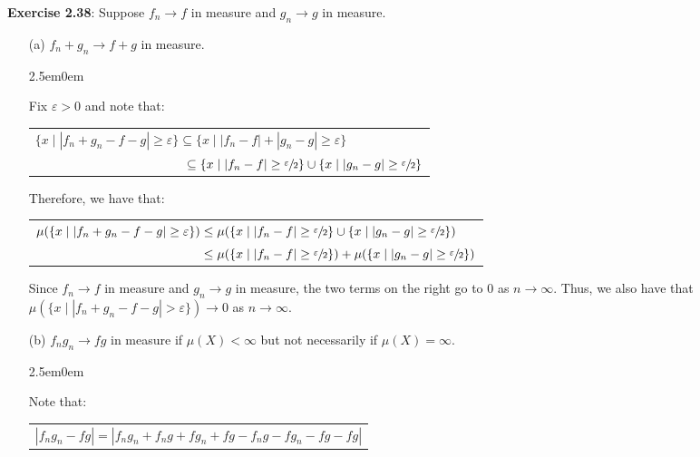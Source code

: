 \documentclass{book}
\newcommand{\exTwoP}{%
   \color{RedViolet}%
   \fontsize{13}{15}\selectfont%
}
\newcommand{\exPP}{%
   \color{RedViolet}%
   \fontsize{12}{14}\selectfont%
}
\newenvironment{myIndent}{%
   \begin{adjustwidth}{2.5em}{0em}%
}{%
   \end{adjustwidth}%
}
\newcommand{\blab}[1]{\textbf{#1}}
\newcommand{\retTwo}{\hfill\bigbreak}
\begin{document}
\blab{Exercise 2.38}: Suppose $f_n \rightarrow f$ in measure and $g_n \rightarrow g$ in measure.
\begin{enumerate}
	\item[(a)] $f_n + g_n \rightarrow f + g$ in measure.
	
	\begin{myIndent}\exTwoP
		Fix $\varepsilon > 0$ and note that:

		{\centering\begin{tabular}{l}
			$\{x \mid |f_n + g_n - f - g| \geq \varepsilon\} \subseteq \{x \mid |f_n - f| + |g_n - g|  \geq \varepsilon\}$\\

			$\phantom{\{x \mid |f_n + g_n - f - g| \geq \varepsilon\}} \subseteq \{x \mid |f_n - f| \geq \sfrac{\varepsilon}{2} \} \cup \{x \mid |g_n - g| \geq \sfrac{\varepsilon}{2}\} $
		\end{tabular}\retTwo\par}

		Therefore, we have that:
		
		{\centering\exPP
		\begin{tabular}{l}
			$\mu(\{x \mid |f_n + g_n - f - g| \geq\varepsilon\}) \leq \mu(\{x \mid |f_n - f| \geq \sfrac{\varepsilon}{2} \} \cup \{x \mid |g_n - g| \geq \sfrac{\varepsilon}{2}\})$\\

			$\phantom{\mu(\{x \mid |f_n + g_n - f - g| \geq\varepsilon\})} \leq \mu(\{x \mid |f_n - f| \geq \sfrac{\varepsilon}{2} \}) + \mu(\{x \mid |g_n - g| \geq \sfrac{\varepsilon}{2}\})$
		\end{tabular}\newpage\par}

		Since $f_n \rightarrow f$ in measure and $g_n \rightarrow g$ in measure, the two terms on the right go to $0$ as $n \rightarrow \infty$. Thus, we also have that $\mu(\{x \mid |f_n + g_n - f - g| >\varepsilon\}) \rightarrow 0$ as $n \rightarrow \infty$.\retTwo
	\end{myIndent}

	\item[(b)] $f_ng_n \rightarrow fg$ in measure if $\mu(X) < \infty$ but not necessarily if $\mu(X) = \infty$. 
	
	\begin{myIndent}\exTwoP
		Note that:

		{\centering
		\begin{tabular}{l}
			$|f_ng_n - fg| = |f_ng_n + f_ng + fg_n + fg - f_ng - fg_n - fg -fg|$\\ [3pt]


\end{tabular}}
\end{myIndent}
\end{enumerate}
\end{document}
